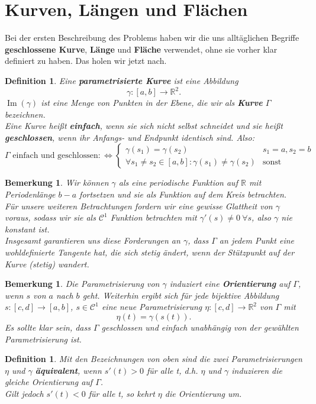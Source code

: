 \documentclass[12pt,a4paper]{article}
\theoremstyle{plain}
\newtheorem{Definition}[Theorem]{Definition}
\newtheorem{Bemerkung}[Theorem]{Bemerkung}
\newcommand{\herv}[1]{{\emph{\textbf{#1}}}}
\newcommand{\R}{\mathbb{R}}
\numberwithin{equation}{section}
\begin{document}
\section{Kurven, Längen und Flächen}
Bei der ersten Beschreibung des Problems haben wir die uns alltäglichen Begriffe \textbf{geschlossene Kurve}, \textbf{Länge} und \textbf{Fläche} verwendet, ohne sie vorher klar definiert zu haben. Das holen wir jetzt nach.
\begin{Definition}
Eine \herv{parametrisierte Kurve} ist eine Abbildung \[ \gamma:[a,b] \rightarrow \R^2 .\]
$\operatorname{Im}(\gamma)$ ist eine Menge von Punkten in der Ebene, die wir als \herv{Kurve} $\Gamma$ bezeichnen.\\
Eine Kurve heißt \herv{einfach}, wenn sie sich nicht selbst schneidet und sie heißt \herv{geschlossen}, wenn ihr Anfangs- und Endpunkt identisch sind. Also:
\[ \Gamma \text{ einfach und geschlossen} :\Leftrightarrow \left\lbrace \begin{array}{ll}
\gamma(s_1)=\gamma(s_2)& s_1=a, s_2=b  \\ \forall s_1\neq s_2 \in [a,b]:  \gamma(s_1)\neq \gamma(s_2) & \text{sonst} \end{array}\right. \]
\end{Definition}
\begin{Bemerkung}
Wir können $\gamma$ als eine periodische Funktion auf $\R$ mit Periodenlänge $b-a$ fortsetzen und sie als Funktion auf dem Kreis betrachten.\\
Für unsere weiteren Betrachtungen fordern wir eine gewisse Glattheit von $\gamma$ voraus, sodass wir sie als $\mathcal{C}^1$ Funktion betrachten mit $\gamma'(s)\neq 0\ \forall s$, also $\gamma$ nie konstant ist. \\
Insgesamt garantieren uns diese Forderungen an $\gamma$, dass $\Gamma$ an jedem Punkt eine wohldefinierte Tangente hat, die sich stetig ändert, wenn der Stützpunkt auf der Kurve (stetig) wandert.
\end{Bemerkung}
\begin{Bemerkung}
Die Parametrisierung von $\gamma$ induziert eine \textbf{Orientierung} auf $\Gamma$, wenn $s$ von $a$ nach $b$ geht. Weiterhin ergibt sich für jede bijektive Abbildung $s: [c,d] \rightarrow [a,b]$, $s\in \mathcal{C}^1$ eine neue Parametrisierung $\eta:[c,d] \rightarrow \R^2$ von $\Gamma$ mit \[ \eta(t) = \gamma(s(t)).\]
Es sollte klar sein, dass $\Gamma$ geschlossen und einfach unabhängig von der gewählten Parametrisierung ist.
\end{Bemerkung}
\begin{Definition}
Mit den Bezeichnungen von oben sind die zwei Parametrisierungen $\eta$ und $\gamma$ \herv{äquivalent}, wenn $s'(t)>0$ für alle t, d.h. $\eta$ und $\gamma$ induzieren die gleiche Orientierung auf $\Gamma$.\\
Gilt jedoch $s'(t)<0$ für alle t, so kehrt $\eta$ die Orientierung um.
\end{Definition}
\end{document}
